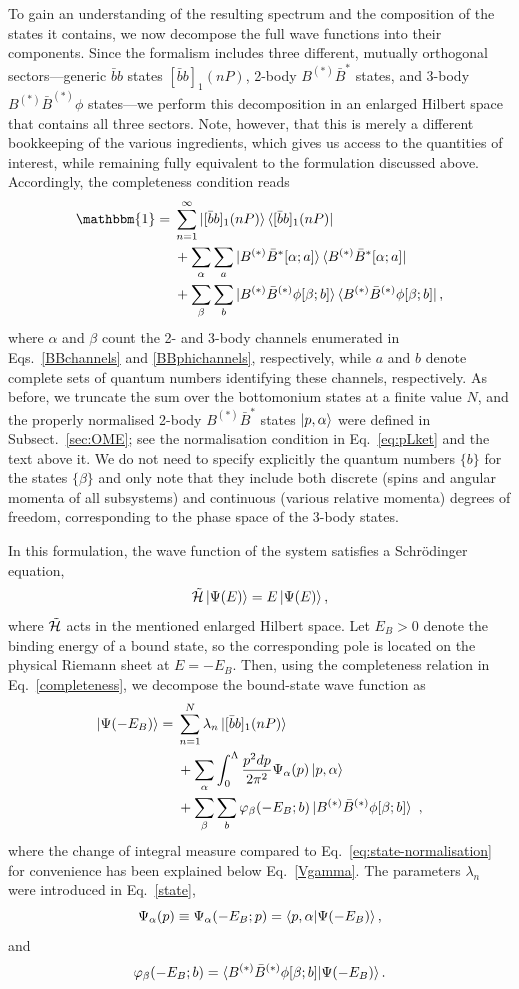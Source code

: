 \documentclass[aps,prd,showpacs,amsmath,twocolumn,superscriptaddress,floatfix,nofootinbib,notitlepage]{revtex4-2}
\newcommand{\bbnP}{[\bar{b}b]_1(nP)}
\newcommand{\be}{\begin{equation}}
\newcommand{\ee}{\end{equation}}
\newcommand{\tilH}{\tilde{{\cal H}}}
\begin{document}
To gain an understanding of the resulting spectrum and the composition of the states it contains, we now decompose the full wave functions into their components. Since the formalism includes three different, mutually orthogonal sectors---generic $\bar{b}b$ states $\bbnP$, 2-body $B^{(*)}\bar{B}^*$ states, and 3-body $B^{(*)}\bar{B}^{(*)} \phi$ states---we perform this decomposition in an enlarged Hilbert space that contains all three sectors. Note, however, that this is merely a different bookkeeping of the various ingredients, which gives us access to the quantities of interest, while remaining fully equivalent to the formulation discussed above. 
Accordingly, the completeness condition reads
\be
\begin{split}
\mathbbm{1}={}&\sum_{n=1}^\infty\ket{\bbnP}\bra{\bbnP}\\
&+\sum_\alpha\sum_{a} \ket{B^{(*)}\bar{B}^*[\alpha;a]}\bra{B^{(*)}\bar{B}^*[\alpha;a]}\\
&+\sum_\beta\sum_{b}\ket{B^{(*)}\bar{B}^{(*)}\phi[\beta;b]}\bra{B^{(*)}\bar{B}^{(*)}\phi[\beta;b]},
\end{split}
\label{completeness}
\ee
where $\alpha$ and $\beta$ count the 2- and 3-body channels enumerated in Eqs.~\eqref{BBchannels} and \eqref{BBphichannels}, respectively, while $a$ and $b$ denote complete sets of 
quantum numbers identifying these channels, respectively. As before, we truncate the sum over the bottomonium states at a finite value $N$, and the properly normalised 2-body $B^{(*)}\bar{B}^*$ states ${\ket{p,\alpha}}$ were defined in Subsect.~\ref{sec:OME}; see the normalisation condition in Eq.~\eqref{eq:pLket} and the text above it. We do not need to specify explicitly the quantum numbers $\{b\}$ for the states $\{\beta\}$ and only note that they include both discrete (spins and angular momenta of all subsystems) and continuous (various relative momenta) degrees of freedom, corresponding to the phase space of the 3-body states.

In this formulation, the wave function of the system satisfies a Schr{\"o}dinger equation,
\be
\tilH\ket{\Psi(E)}=E\ket{\Psi(E)},
\label{eq:schroedinger-full}
\ee
where $\tilH$ acts in the mentioned enlarged Hilbert space.
Let $E_B>0$ denote the binding energy of a bound state, so the corresponding pole is located on the physical Riemann sheet at $E=-E_B$. 
Then, using the completeness relation in Eq.~\eqref{completeness}, we decompose the bound-state wave function as 
\begin{align}
\ket{\Psi(-E_B)}={}&
\sum_{n=1}^{N}\lambda_n
\ket{\bbnP}\notag\\
&+\sum_{\alpha}
\int_0^\Lambda\frac{p^2dp}{2\pi^2}\Psi_\alpha(p)
\ket{p,\alpha}\label{eq:bound-state-decomposition}\\
&+\sum_\beta\sum_b
\varphi_\beta(-E_B;b)
\ket{B^{(*)}\bar{B}^{(*)}\phi[\beta;b]}\notag \ ,
\end{align}
where the change of integral measure compared to Eq.~\eqref{eq:state-normalisation} for convenience has been explained below Eq.~\eqref{Vgamma}. 
The parameters $\lambda_n$ were introduced in Eq.~\eqref{state},
\be
\Psi_\alpha(p)\equiv \Psi_\alpha(-E_B;p)=\braket{p,\alpha|\Psi(-E_B)},
\label{psiL}
\ee
and
\be
\varphi_\beta(-E_B;b)=\braket{B^{(*)}\bar{B}^{(*)}\phi[\beta;b]|\Psi(-E_B)}.
\ee
\end{document}
